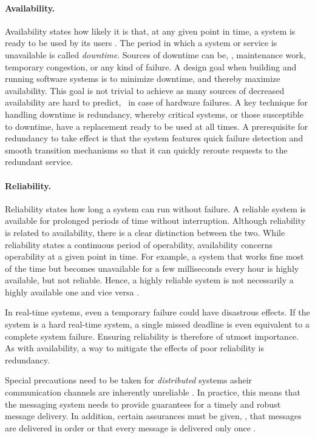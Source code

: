 \paragraph{Availability.}
Availability states how likely it is that, at any given point in time, a system is ready to be used by its users \cite{tanenbaum2017distributed}. The period in which a system or service is unavailable is called \emph{downtime}. Sources of downtime can be, \eg , maintenance work, temporary congestion, or any kind of failure. A design goal when building and running software systems is to minimize downtime, and thereby maximize availability. This goal is not trivial to achieve as many sources of decreased availability are hard to predict, \eg\ in case of hardware failures. A key technique for handling downtime is redundancy, whereby critical systems, or those susceptible to downtime, have a replacement ready to be used at all times. A prerequisite for redundancy to take effect is that the system features quick failure detection and smooth transition mechanisms so that it can quickly reroute requests to the redundant service.

\paragraph{Reliability.}
Reliability states how long a system can run without failure. A reliable system is available for prolonged periods of time without interruption. Although reliability is related to availability, there is a clear distinction between the two. While reliability states a continuous period of operability, availability concerns operability at a given point in time. For example, a system that works fine most of the time but becomes unavailable for a few milliseconds every hour is highly available, but not reliable. Hence, a highly reliable system is not necessarily a highly available one and vice versa \cite{tanenbaum2017distributed}.

In real-time systems, even a temporary failure could have disastrous effects. If the system is a hard real-time system, a single missed deadline is even equivalent to a complete system failure. Ensuring reliability is therefore of utmost importance. As with availability, a way to mitigate the effects of poor reliability is redundancy.

Special precautions need to be taken for \emph{distributed} systems asheir communication channels are inherently unreliable \cite{tanenbaum2017distributed}. In practice, this means that the messaging system needs to provide guarantees for a timely and robust message delivery. In addition, certain assurances must be given, \eg , that messages are delivered in order or that every message is delivered only once \cite{o2007quality}. 

